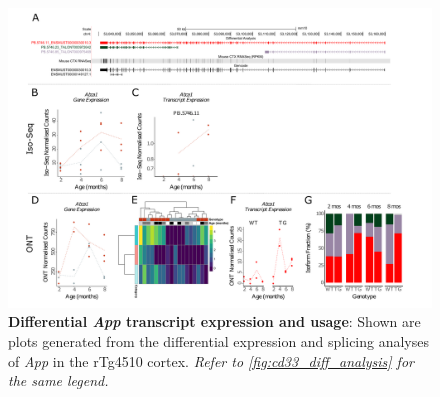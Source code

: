 \begin{landscape}
	\begin{figure}[htp]
		\begin{center}
			\includegraphics[page=5,trim={0 0.5cm 0 1.5cm},scale =0.85]{Figures/TargetGene_DifferentialAnalysis.pdf}
		\end{center}
		\captionsetup{width=1.5\textwidth}
		\caption[Differential \textit{App} transcript expression and usage]%
		{\textbf{Differential \textit{App} transcript expression and usage}: Shown are plots generated from the differential expression and splicing analyses of \textit{App} in the rTg4510 cortex. \textit{Refer to \cref{fig:cd33_diff_analysis} for the same legend.}}   
		\label{fig:App_diff_analysis}
	\end{figure}
\end{landscape}

